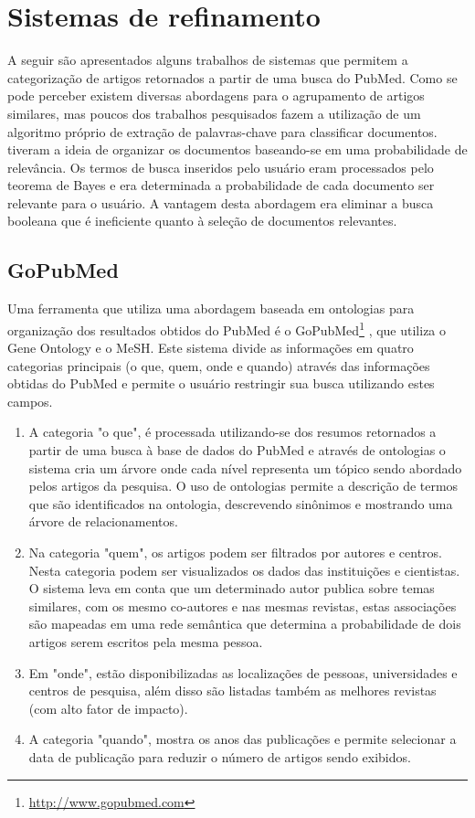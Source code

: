 \section{Sistemas de refinamento}

A seguir são apresentados alguns trabalhos de sistemas que permitem a categorização de artigos retornados a partir de uma busca do PubMed. Como se pode perceber existem diversas abordagens para o agrupamento de artigos similares, mas poucos dos trabalhos pesquisados fazem a utilização de um algoritmo próprio de extração de palavras-chave para classificar documentos. \cite{Maron1958} tiveram a ideia de organizar os documentos baseando-se em uma probabilidade de relevância. Os termos de busca inseridos pelo usuário eram processados pelo teorema de Bayes e era determinada a probabilidade de cada documento ser relevante para o usuário. A vantagem desta abordagem era eliminar a busca booleana que é ineficiente quanto à seleção de documentos relevantes.

\subsection{GoPubMed}

Uma ferramenta que utiliza uma abordagem baseada em ontologias para organização dos resultados obtidos do PubMed é o GoPubMed\footnote{\href{http://www.gopubmed.com}{http://www.gopubmed.com}} \cite{Doms2005}, que utiliza o Gene Ontology e o MeSH. Este sistema divide as informações em quatro categorias principais (o que, quem, onde e quando) através das informações obtidas do PubMed e  permite o usuário restringir sua busca utilizando estes campos.

\begin{enumerate}
\item A categoria "o que", é processada utilizando-se dos resumos retornados a partir de uma busca à base de dados do PubMed e através de ontologias o sistema cria um árvore onde cada nível representa um tópico sendo abordado pelos artigos da pesquisa. O uso de ontologias permite a descrição de termos que são identificados na ontologia, descrevendo sinônimos e mostrando uma árvore de relacionamentos.

\item Na categoria "quem", os artigos podem ser filtrados por autores e centros. Nesta categoria podem ser visualizados os dados das instituições e cientistas. O sistema leva em conta que um determinado autor publica sobre temas similares, com os mesmo co-autores e nas mesmas revistas, estas associações são mapeadas em uma rede semântica que determina a probabilidade de dois artigos serem escritos pela mesma pessoa.

\item Em "onde", estão disponibilizadas as localizações de pessoas, universidades e centros de pesquisa, além disso são listadas também as melhores revistas (com alto fator de impacto).

\item A categoria "quando", mostra os anos das publicações e permite selecionar a data de publicação para reduzir o número de artigos sendo exibidos.
\end{enumerate}

